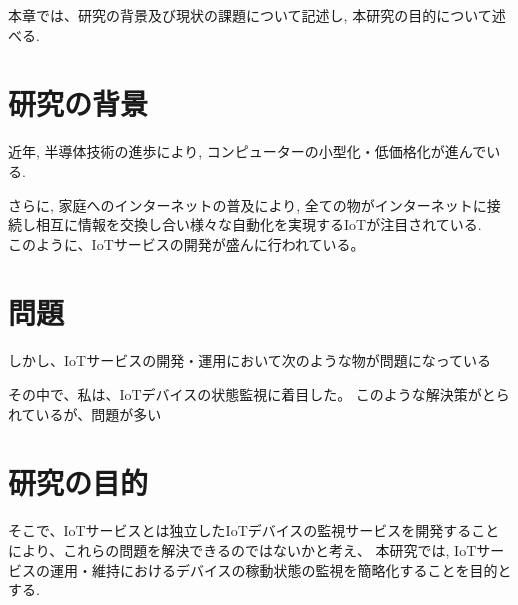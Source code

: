 本章では、研究の背景及び現状の課題について記述し, 本研究の目的について述べる.
\section{研究の背景}
近年, 半導体技術の進歩により, コンピューターの小型化・低価格化が進んでいる. 


さらに, 家庭へのインターネットの普及により, 全ての物がインターネットに接続し相互に情報を交換し合い様々な自動化を実現するIoTが注目されている.\\


このように、IoTサービスの開発が盛んに行われている。
\section{問題}%
しかし、IoTサービスの開発・運用において次のような物が問題になっている



その中で、私は、IoTデバイスの状態監視に着目した。
このような解決策がとられているが、問題が多い

\section{研究の目的}
そこで、IoTサービスとは独立したIoTデバイスの監視サービスを開発することにより、これらの問題を解決できるのではないかと考え、
本研究では, IoTサービスの運用・維持におけるデバイスの稼動状態の監視を簡略化することを目的とする.

